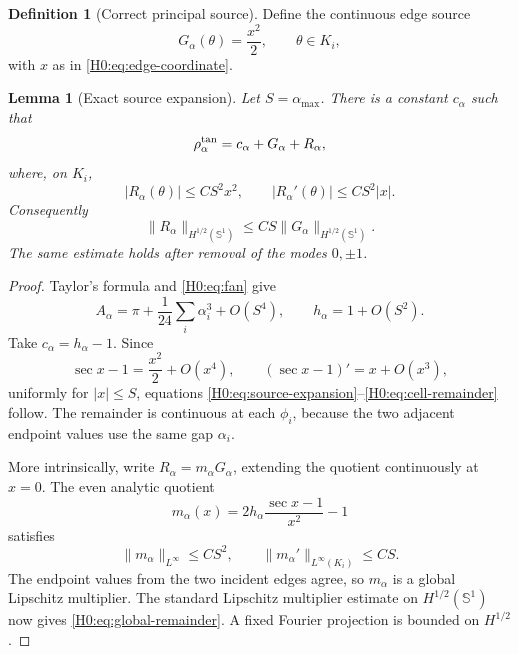 \documentclass[11pt]{amsart}
\numberwithin{equation}{section}
\newtheorem{lemma}[theorem]{Lemma}
\theoremstyle{definition}
\newtheorem{definition}[theorem]{Definition}
\theoremstyle{remark}
\newcommand{\Sone}{\mathbb S^1}
\begin{document}
\begin{definition}[Correct principal source]\label{H0:def:G}
Define the continuous edge source
\begin{equation}\label{H0:eq:G}
 G_\alpha(\theta)=\frac{x^2}{2},
 \qquad \theta\in K_i,
\end{equation}
with $x$ as in \eqref{H0:eq:edge-coordinate}.
\end{definition}

\begin{lemma}[Exact source expansion]\label{H0:lem:source-expansion}
Let $S=\alpha_{\max}$.  There is a constant $c_\alpha$ such that
\begin{equation}\label{H0:eq:source-expansion}
 \rho_\alpha^{\rm tan}=c_\alpha+G_\alpha+R_\alpha,
\end{equation}
where, on $K_i$,
\begin{equation}\label{H0:eq:cell-remainder}
 |R_\alpha(\theta)|\le CS^2x^2,
 \qquad |R_\alpha'(\theta)|\le CS^2|x|.
\end{equation}
Consequently
\begin{equation}\label{H0:eq:global-remainder}
 \|R_\alpha\|_{H^{1/2}(\Sone)}
 \le CS\|G_\alpha\|_{H^{1/2}(\Sone)}.
\end{equation}
The same estimate holds after removal of the modes $0,\pm1$.
\end{lemma}

\begin{proof}
Taylor's formula and \eqref{H0:eq:fan} give
\begin{equation}
 A_\alpha
 =\pi+\frac1{24}\sum_i\alpha_i^3+O(S^4),
 \qquad h_\alpha=1+O(S^2).
\end{equation}
Take $c_\alpha=h_\alpha-1$.  Since
\begin{equation}
 \sec x-1=\frac{x^2}{2}+O(x^4),
 \qquad (\sec x-1)'=x+O(x^3),
\end{equation}
uniformly for $|x|\le S$, equations
\eqref{H0:eq:source-expansion}--\eqref{H0:eq:cell-remainder} follow.  The
remainder is continuous at each $\phi_i$, because the two adjacent endpoint
values use the same gap $\alpha_i$.

More intrinsically, write $R_\alpha=m_\alpha G_\alpha$, extending the
quotient continuously at $x=0$.  The even analytic quotient
\begin{equation}
 m_\alpha(x)=2h_\alpha\frac{\sec x-1}{x^2}-1
\end{equation}
satisfies
\begin{equation}
 \|m_\alpha\|_{L^\infty}\le CS^2,
 \qquad \|m_\alpha'\|_{L^\infty(K_i)}\le CS.
\end{equation}
The endpoint values from the two incident edges agree, so $m_\alpha$ is a
global Lipschitz multiplier.  The standard Lipschitz multiplier estimate on
$H^{1/2}(\Sone)$ now gives \eqref{H0:eq:global-remainder}.  A fixed Fourier
projection is bounded on $H^{1/2}$.
\end{proof}
\end{document}
